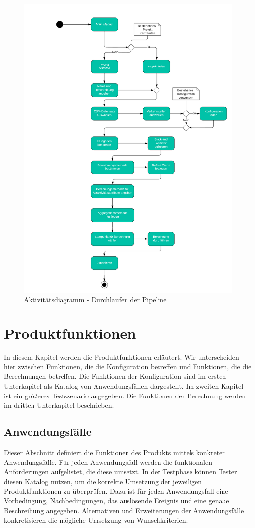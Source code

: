 \documentclass[parskip=full]{scrartcl} %
\begin{document}
\begin{figure}
    \centering
    \includegraphics[width=.9\textwidth,cfbox=black 1pt 0pt]{pictures/Aktivitqetsdiagramm1.png}
    \caption{Aktivitätsdiagramm - Durchlaufen der Pipeline}
\end{figure}


\section{Produktfunktionen}
In diesem Kapitel werden die Produktfunktionen erläutert. Wir unterscheiden hier zwischen Funktionen, die die Konfiguration betreffen und Funktionen, die die Berechnungen betreffen. Die Funktionen der Konfiguration sind im ersten Unterkapitel als Katalog von Anwendungsfällen dargestellt. Im zweiten Kapitel ist ein größeres Testszenario angegeben. Die Funktionen der Berechnung werden im dritten Unterkapitel beschrieben.

\subsection{Anwendungsfälle}
Dieser Abschnitt definiert die Funktionen des Produkts mittels konkreter Anwendungsfälle. Für jeden Anwendungsfall werden die funktionalen Anforderungen aufgelistet, die diese umsetzt. In der Testphase können Tester diesen Katalog nutzen, um die korrekte Umsetzung der jeweiligen Produktfunktionen zu überprüfen. Dazu ist für jeden Anwendungsfall eine Vorbedingung, Nachbedingungen, das auslösende Ereignis und eine genaue Beschreibung angegeben. Alternativen und Erweiterungen der Anwendungsfälle konkretisieren die mögliche Umsetzung von Wunschkriterien.
\newpage
\end{document}
